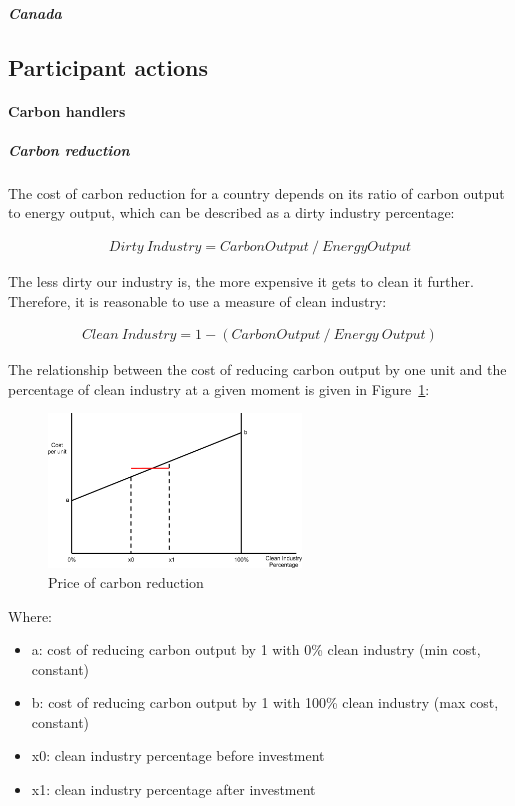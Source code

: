 \subparagraph{Canada}

%
%

\subsection{Participant actions}

\paragraph{Carbon handlers}

\subparagraph{Carbon reduction}

The cost of carbon reduction for a country depends on its ratio of carbon output to energy output, which can be described as a dirty industry percentage:

\begin{align*}
Dirty~Industry = Carbon Output~/~Energy Output
\end{align*}

The less dirty our industry is, the more expensive it gets to clean it further. Therefore, it is reasonable to use a measure of clean industry:

\begin{align*}
Clean~Industry = 1 - (Carbon Output~/~Energy~Output)
\end{align*}
 
The relationship between the cost of reducing carbon output by one unit and the percentage of 
clean industry at a given moment is given in Figure~\ref{fig:carbon_reduction}:

\begin{figure}[h!]
	\centering
	\includegraphics[width=0.6\textwidth]{img/carbon-reduction.png}
	\caption{Price of carbon reduction}
	\label{fig:carbon_reduction}
\end{figure}

Where:
\begin{itemize}
	\item a: cost of reducing carbon output by 1 with 0\% clean industry (min cost, constant)
	\item b: cost of reducing carbon output by 1 with 100\% clean industry (max cost, constant)
	\item x0: clean industry percentage before investment
	\item x1: clean industry percentage after investment
\end{itemize}

